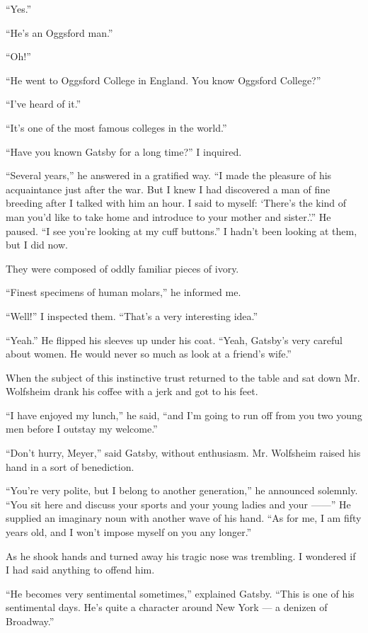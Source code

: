 \documentclass{znotebook}
\begin{document}
``Yes.''

``He's an Oggsford man.''

``Oh!''

``He went to Oggsford College in England. You know Oggsford College?''

``I've heard of it.''

``It's one of the most famous colleges in the world.''

``Have you known Gatsby for a long time?'' I inquired.

``Several years,'' he answered in a gratified way. ``I made the pleasure of his acquaintance just after the war. But I knew I had discovered a man of fine breeding after I talked with him an hour. I said to myself: ‘There's the kind of man you'd like to take home and introduce to your mother and sister.'.'' He paused. ``I see you're looking at my cuff buttons.'' I hadn't been looking at them, but I did now.

They were composed of oddly familiar pieces of ivory.

``Finest specimens of human molars,'' he informed me.

``Well!'' I inspected them. ``That's a very interesting idea.''

``Yeah.'' He flipped his sleeves up under his coat. ``Yeah, Gatsby's very careful about women. He would never so much as look at a friend's wife.''

When the subject of this instinctive trust returned to the table and sat down Mr. Wolfsheim drank his coffee with a jerk and got to his feet.

``I have enjoyed my lunch,'' he said, ``and I'm going to run off from you two young men before I outstay my welcome.''

``Don't hurry, Meyer,'' said Gatsby, without enthusiasm. Mr. Wolfsheim raised his hand in a sort of benediction.

``You're very polite, but I belong to another generation,'' he announced solemnly. ``You sit here and discuss your sports and your young ladies and your ——'' He supplied an imaginary noun with another wave of his hand. ``As for me, I am fifty years old, and I won't impose myself on you any longer.''

As he shook hands and turned away his tragic nose was trembling. I wondered if I had said anything to offend him.

``He becomes very sentimental sometimes,'' explained Gatsby. ``This is one of his sentimental days. He's quite a character around New York — a denizen of Broadway.''
\end{document}
